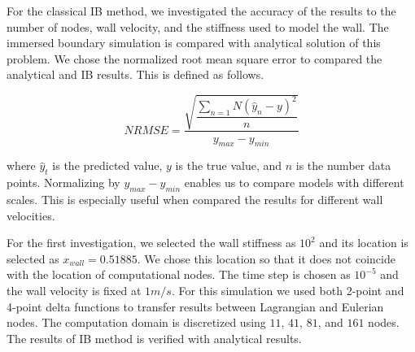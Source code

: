 For the classical IB method, we investigated the accuracy of the results to the number of nodes, wall velocity, and the stiffness used to model the wall. The immersed boundary simulation is compared with analytical solution of this problem. We chose the normalized root mean square error to compared the analytical and IB results. This is defined as follows.

\begin{equation*}
	NRMSE = \dfrac{\sqrt{\dfrac{\sum_{n=1}{N} \left( \hat{y}_n - y \right)^2}{n}}}{y_{max} - y_{min}}
\end{equation*}

where $\hat{y}_t$ is the predicted value, $y$ is the true value, and $n$ is the number data points. Normalizing by $y_{max} - y_{min}$ enables us to compare models with different scales. This is especially useful when compared the results for different wall velocities.

For the first investigation, we selected the wall stiffness as $10^2$ and its location is selected as $x_{wall} = 0.51885$. We chose this location so that it does not coincide with the location of computational nodes. The time step is chosen as $10^{-5}$ and the wall velocity is fixed at $1 m/s$. For this simulation we used both 2-point and 4-point delta functions to transfer results between Lagrangian and Eulerian nodes. The computation domain is discretized using $11$, $41$, $81$, and $161$ nodes. The results of IB method is verified with analytical results.

